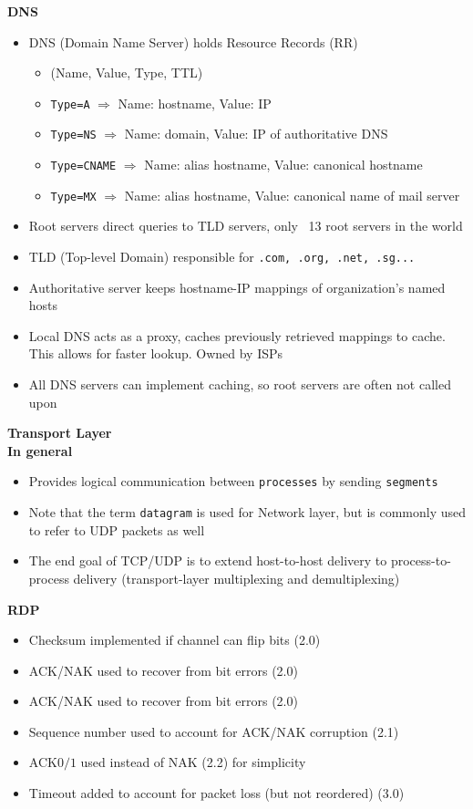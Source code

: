 \documentclass[a4paper]{article} \usepackage[backend=biber, style=numeric, sorting=none]{biblatex}
\begin{document}
\begin{multicols*}{4}
\textbf{DNS}
\begin{itemize}[leftmargin=*]
\item DNS (Domain Name Server) holds Resource Records (RR)
  \begin{itemize}[leftmargin=*]
  \item (Name, Value, Type, TTL)
  \item \texttt{Type=A} $\Rightarrow$ Name: hostname, Value: IP
  \item \texttt{Type=NS} $\Rightarrow$ Name: domain, Value: IP of authoritative DNS
  \item \texttt{Type=CNAME} $\Rightarrow$ Name: alias hostname, Value: canonical hostname
  \item \texttt{Type=MX} $\Rightarrow$ Name: alias hostname, Value: canonical name of mail server
  \end{itemize}
\item Root servers direct queries to TLD servers, only ~13 root servers in the world
\item TLD (Top-level Domain) responsible for \texttt{.com, .org, .net, .sg...}
\item Authoritative server keeps hostname-IP mappings of organization's named hosts
\item Local DNS acts as a proxy, caches previously retrieved mappings to cache. This allows for faster lookup. Owned by ISPs
\item All DNS servers can implement caching, so root servers are often not called upon
\end{itemize}

{\small\textbf{Transport Layer}} \\
\textbf{In general}
\begin{itemize}[leftmargin=*]
\item Provides logical communication between \texttt{processes} by sending \texttt{segments}
\item Note that the term \texttt{datagram} is used for Network layer, but is commonly used to refer to UDP packets as well
\item The end goal of TCP/UDP is to extend host-to-host delivery to process-to-process delivery (transport-layer multiplexing and demultiplexing)
\end{itemize}

\textbf{RDP}
\begin{itemize}[leftmargin=*]
\item Checksum implemented if channel can flip bits (2.0)
\item ACK/NAK used to recover from bit errors (2.0)
\item ACK/NAK used to recover from bit errors (2.0)
\item Sequence number used to account for ACK/NAK corruption (2.1)
\item ACK$0/1$ used instead of NAK (2.2) for simplicity
\item Timeout added to account for packet loss (but not reordered) (3.0)
\end{itemize}


\end{multicols*}
\end{document}
